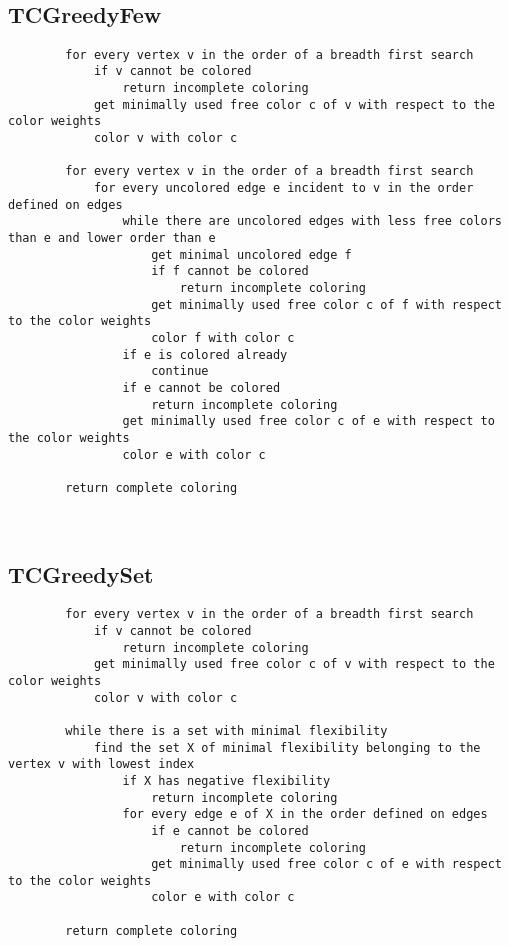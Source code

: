 \documentclass{article}
\begin{document}
	~\newpage
			
	\subsection{TCGreedyFew}
	\begin{verbatim}
		for every vertex v in the order of a breadth first search
		    if v cannot be colored
		        return incomplete coloring
		    get minimally used free color c of v with respect to the color weights
		    color v with color c
				    
		for every vertex v in the order of a breadth first search
		    for every uncolored edge e incident to v in the order defined on edges
		        while there are uncolored edges with less free colors than e and lower order than e
		            get minimal uncolored edge f
		            if f cannot be colored
		                return incomplete coloring
		            get minimally used free color c of f with respect to the color weights
		            color f with color c
		        if e is colored already
		            continue
		        if e cannot be colored
		            return incomplete coloring
		        get minimally used free color c of e with respect to the color weights
		        color e with color c
				        
		return complete coloring
	\end{verbatim}
	
	~\newpage
	
	\subsection{TCGreedySet}
	\begin{verbatim}
		for every vertex v in the order of a breadth first search
		    if v cannot be colored
		        return incomplete coloring
		    get minimally used free color c of v with respect to the color weights
		    color v with color c
				    
		while there is a set with minimal flexibility
		    find the set X of minimal flexibility belonging to the vertex v with lowest index
		        if X has negative flexibility
		            return incomplete coloring
		        for every edge e of X in the order defined on edges
		            if e cannot be colored
		                return incomplete coloring
		            get minimally used free color c of e with respect to the color weights
		            color e with color c
				        
		return complete coloring
	\end{verbatim}
	
\end{document}

